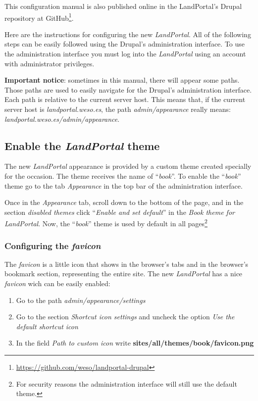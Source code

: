 This configuration manual is also published online in the LandPortal's Drupal repository at GitHub\footnote{\url{https://github.com/weso/landportal-drupal}}.

Here are the instructions for configuring the new \textit{LandPortal}.  All of the following steps can be easily followed using the Drupal's administration interface.  To use the administration interface you must log into the \textit{LandPortal} using an account with administrator privileges.

\textbf{Important notice}:  sometimes in this manual, there will appear some paths.  Those paths are used to easily navigate for the Drupal's administration interface.  Each path is relative to the current server host.  This means that, if the current server host is \textit{landportal.weso.es}, the path \textit{admin/appearance} really means:\\ \textit{landportal.weso.es/admin/appearance}.


\subsection{Enable the \textit{LandPortal} theme}
The new \textit{LandPortal} appearance is provided by a custom theme created specially for the occasion.  The theme receives the name of ``\textit{book}''.  To enable the ``\textit{book}'' theme go to the tab \textit{Appearance} in the top bar of the administration interface.

Once in the \textit{Appearance} tab, scroll down to the bottom of the page, and in the section \textit{disabled themes} click ``\textit{Enable and set default}'' in the \textit{Book theme for LandPortal}.  Now, the ``\textit{book}'' theme is used by default in all pages\footnote{For security reasons the administration interface will still use the default theme.}


\subsubsection{Configuring the \textit{favicon}}
The \textit{favicon} is a little icon that shows in the browser's tabs and in the browser's bookmark section, representing the entire site.  The new \textit{LandPortal} has a nice \textit{favicon} wich can be easily enabled:
\begin{enumerate}
	\item Go to the path \textit{admin/appearance/settings}
	\item Go to the section \textit{Shortcut icon settings} and uncheck the option \textit{Use the default shortcut icon}
	\item In the field \textit{Path to custom icon} write \textbf{sites/all/themes/book/favicon.png}
\end{enumerate}

